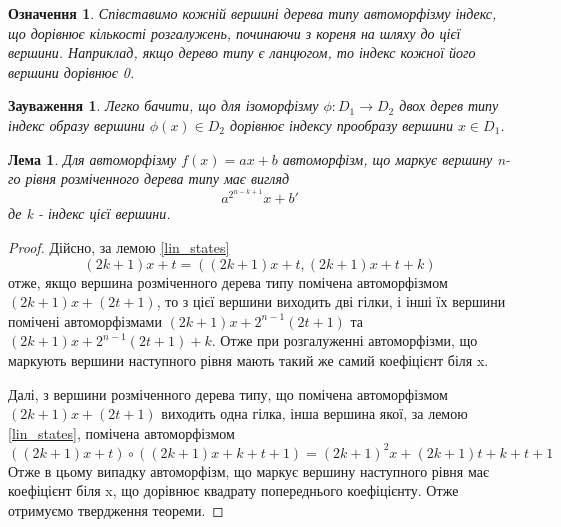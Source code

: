 \documentclass[a4paper,12pt]{article} \usepackage{a4wide}
\numberwithin{equation}{subsection}
\newtheorem{lemma}{Лема}[subsection]
\newtheorem{remark}{Зауваження}[subsection]
\newtheorem{definition}{Означення}[subsection]
\begin{document}
\begin{definition}\label{vertex_index}
  Співставимо кожній вершині дерева типу автоморфізму індекс, що
  дорівнює кількості розгалужень, починаючи з кореня на шляху до цієї
  вершини. Наприклад, якщо дерево типу є ланцюгом, то індекс кожної
  його вершини дорівнює 0.
\end{definition}

\begin{remark}\label{equal_index}
  Легко бачити, що для ізоморфізму $\phi : D_1 \rightarrow D_2$ двох
  дерев типу індекс образу вершини $\phi(x) \in D_2$ дорівнює індексу
  прообразу вершини $x\in D_1$.
\end{remark}

\begin{lemma}\label{marked_vertex_value}
  Для автоморфізму $f(x)=ax+b$ автоморфізм, що маркує вершину n-го
  рівня розміченного дерева типу має вигляд
$$a^{2^{n-k+1}}x+b'$$
де k - індекс цієї вершини.
\end{lemma}
\begin{proof}
  Дійсно, за лемою \ref{lin_states}
$$(2k+1)x+t = ((2k+1)x+t,(2k+1)x+t+k) $$ отже, якщо вершина розміченного дерева типу помічена автоморфізмом $(2k+1)x+(2t+1)$, то з цієї вершини виходить дві гілки, і інші їх вершини помічені автоморфізмами $(2k+1)x+2^{n-1}(2t+1)$ та $ (2k+1)x+2^{n-1}(2t+1)+k $. Отже при розгалуженні автоморфізми, що маркують вершини наступного рівня мають такий же самий коефіцієнт біля x.

Далі, з вершини розміченного дерева типу, що помічена автоморфізмом
$(2k+1)x+(2t+1)$ виходить одна гілка, інша вершина якої, за лемою
\ref{lin_states}, помічена автоморфізмом
 $$((2k+1)x+t)\circ ((2k+1)x+k+t+1)= (2k+1)^2x + (2k+1)t+k+t+1 $$ 
 Отже в цьому випадку автоморфізм, що маркує вершину наступного рівня
 має коефіцієнт біля x, що дорівнює квадрату попереднього
 коефіцієнту. Отже отримуємо твердження теореми.

\end{proof}
\end{document}
